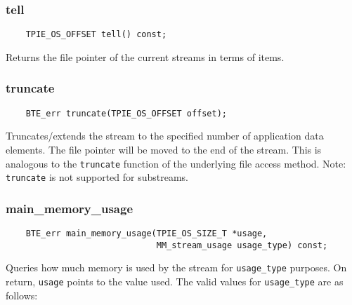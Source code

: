 \vspace*{\baselineskip}
\subsubsection{tell}

\begin{lstlisting}
    TPIE_OS_OFFSET tell() const;
\end{lstlisting}

\noindent
Returns the file pointer of the current streams in terms of items.


\vspace*{\baselineskip}
\subsubsection{truncate}

\begin{lstlisting}
    BTE_err truncate(TPIE_OS_OFFSET offset);
\end{lstlisting}

\noindent
Truncates/extends the stream to the specified number of application
data elements. The file pointer will be moved to the end of the
stream. This is analogous to the \lstinline|truncate| function of the
underlying file access method.  Note: \lstinline|truncate| is not
supported for substreams.

\vspace*{\baselineskip}
\subsubsection{main\_memory\_usage}

\begin{lstlisting}
    BTE_err main_memory_usage(TPIE_OS_SIZE_T *usage,
                              MM_stream_usage usage_type) const;
\end{lstlisting}

\noindent
Queries how much memory is used by the stream for
\lstinline|usage_type| purposes. On return, \lstinline|usage| points
to the value used. The valid values for \lstinline|usage_type| are as
follows:

